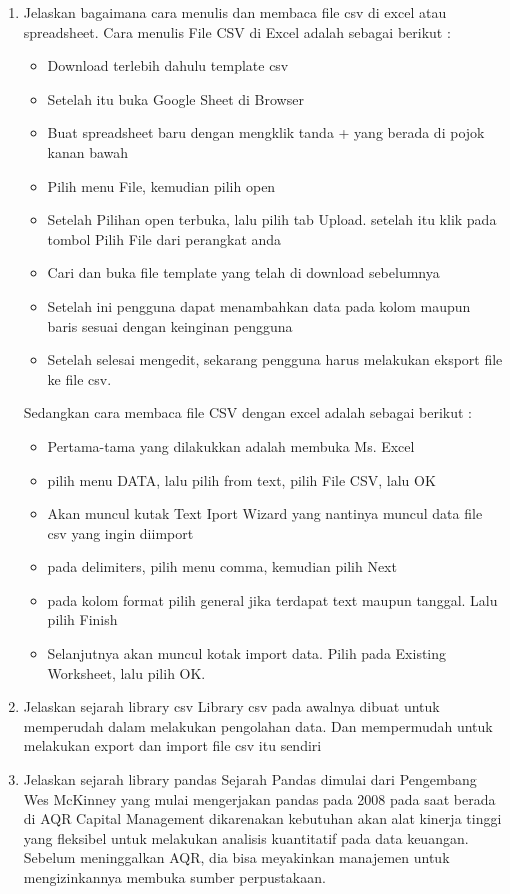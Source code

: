 \begin{enumerate}
	\item Jelaskan bagaimana cara menulis dan membaca file csv di excel atau spreadsheet.
	Cara menulis File CSV di Excel adalah sebagai berikut :
	\begin{itemize}
	\item Download terlebih dahulu template csv
	\item Setelah itu buka Google Sheet di Browser
	\item Buat spreadsheet baru dengan mengklik tanda + yang berada di pojok kanan bawah
	\item Pilih menu File, kemudian pilih open
	\item Setelah Pilihan open terbuka, lalu pilih tab Upload. setelah itu klik pada tombol Pilih File dari perangkat anda
	\item Cari dan buka file template yang telah di download sebelumnya
	\item Setelah ini pengguna dapat menambahkan data pada kolom maupun baris sesuai dengan keinginan pengguna
	\item Setelah selesai mengedit, sekarang pengguna harus melakukan eksport file ke file csv.
	\end{itemize}
	
	Sedangkan cara membaca file CSV dengan excel adalah sebagai berikut :
	\begin{itemize}
	\item Pertama-tama yang dilakukkan adalah membuka Ms. Excel
	\item pilih menu DATA, lalu pilih from text, pilih File CSV, lalu OK
	\item Akan muncul kutak Text Iport Wizard yang nantinya muncul data file csv yang ingin diimport
	\item pada delimiters, pilih menu comma, kemudian pilih Next
	\item pada kolom format pilih general jika terdapat text maupun tanggal. Lalu pilih Finish
	\item Selanjutnya akan muncul kotak import data. Pilih pada Existing Worksheet, lalu pilih OK.
	\end{itemize}
	
	\item Jelaskan sejarah library csv
	Library csv pada awalnya dibuat untuk memperudah dalam melakukan pengolahan data. Dan mempermudah untuk melakukan export dan import file csv itu sendiri
	
	\item Jelaskan sejarah library pandas
	Sejarah Pandas dimulai dari Pengembang Wes McKinney yang mulai mengerjakan pandas pada 2008 pada saat berada di AQR Capital Management dikarenakan kebutuhan akan alat kinerja tinggi yang fleksibel untuk melakukan analisis kuantitatif pada data keuangan. Sebelum meninggalkan AQR, dia bisa meyakinkan manajemen untuk mengizinkannya membuka sumber perpustakaan.


\end{enumerate}
